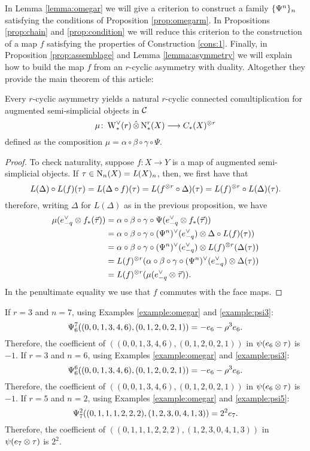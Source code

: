 In Lemma \ref{lemma:omegar} we will give a criterion to construct a family $\{\Psiom^n\}_n$ satisfying the conditions of Proposition \ref{prop:omegarm}. In Propositions \ref{prop:chain} and \ref{prop:condition} we will reduce this criterion to the construction of a map $f$ satisfying the properties of Construction \ref{cons:1}. Finally, in Proposition \ref{prop:assemblage} and Lemma \ref{lemma:asymmetry} we will explain how to build the map $f$ from an $r$-cyclic asymmetry with duality. Altogether they provide the main theorem of this article:

\begin{theorem}\label{thm2:mainthm} Every $r$-cyclic asymmetry yields a natural $r$-cyclic connected comultiplication for augmented semi-simplicial objects in $\cC$
\[
	\mu \colon  \rWd(r)\hotimes \rchains(X)\lra \ucadenas(X)^{ \ot  r}
\]
defined as the composition
	$
	\mu = \alpha\circ\beta\circ\gamma\circ \Psi.
	$
\end{theorem}

\begin{proof}
	To check naturality, suppose $f \colon  X\to Y$ is a map of augmented semi-simplicial objects. If $\tau\in \chains[n](X) = \abel(X)_n$, then, we first have that
	\[
		L(\Delta)\circ L(f)(\tau) = L(\Delta\circ f)(\tau) = L(f^{ \ot  r}\circ \Delta)(\tau) = L(f)^{ \ot  r}\circ L(\Delta)(\tau).
	\]
	therefore, writing $\Delta$ for $L(\Delta)$ as in the previous proposition, we have
	\begin{align*}
	\mu(e^\dd_{-q} \ot  f_*(\vec{\tau}))
		&=	\alpha\circ\beta\circ\gamma\circ \Psi(e_{-q}^\vee \ot  f_*(\vec{\tau}))
		\\
		&= \alpha\circ\beta\circ\gamma\circ(\Psiom^n)^\vee(e_{-q}^\vee) \ot  \Delta\circ L(f)(\tau))
		\\
		&= \alpha\circ\beta\circ\gamma\circ(\Psiom^n)^\vee(e_{-q}^\vee) \ot  L(f)^{ \ot  r}(\Delta(\tau))
		\\
		&= L(f)^{ \ot  r}(\alpha\circ\beta\circ\gamma\circ(\Psiom^n)^\vee(e_{-q}^\vee) \ot  \Delta(\tau))
		\\
		&= L(f)^{ \ot  r}(\mu(e^\dd_{-q} \ot  \vec{\tau})).
	\end{align*}
	In the penultimate equality we use that $f$ commutes with the face maps.
\end{proof}

\begin{example}\label{ex:omegarn} If $r=3$ and $n=7$, using Examples \ref{example:omegar} and \ref{example:psi3}:
	\[
		\Psiom_6^7((0,0,1,3,4,6),(0,1,2,0,2,1)) = -e_6-\rho^3e_6.
	\]
	Therefore, the coefficient of $((0,0,1,3,4,6),(0,1,2,0,2,1))$ in $\psi(e_6 \ot  \tau)$ is $-1$.
 If $r=3$ and $n=6$, using Examples \ref{example:omegar} and \ref{example:psi3}:
	\[
		\Psiom_6^6((0,0,1,3,4,6),(0,1,2,0,2,1)) = -e_6-\rho^3e_6.
	\]
	Therefore, the coefficient of $((0,0,1,3,4,6),(0,1,2,0,2,1))$ in $\psi(e_6 \ot  \tau)$ is $-1$.
 If $r=5$ and $n=2$, using Examples \ref{example:omegar} and \ref{example:psi5}:
	\[
		\Psiom_7^2((0,1,1,1,2,2,2),(1,2,3,0,4,1,3)) = 2^2e_7.
	\]
Therefore, the coefficient of $((0,1,1,1,2,2,2),(1,2,3,0,4,1,3))$ in $\psi(e_7 \ot \tau)$ is $2^2$.
\end{example}

